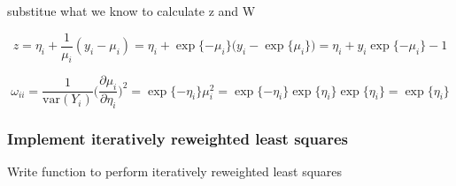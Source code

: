 \documentclass[]{article}
\begin{document}
substitue what we know to calculate z and W

\[z = \eta_i + \frac{1}{\mu_i} (y_i - \mu_i) = \eta_i + \exp{\{-\mu_i\}} \Big(y_i - \exp{\{\mu_i\}} \Big) = \eta_i + y_i \exp{\{-\mu_i\}} - 1\]

\[\omega_{ii} = \frac{1}{\text{var}(Y_i)} \Big( \frac{\partial \mu_i}{\partial \eta_i} \Big)^2 = \exp{\{-\eta_i\}} \mu_i^2 = \exp{\{-\eta_i\}} \exp{\{\eta_i\}} \exp{\{\eta_i\}} = \exp{\{\eta_i\}}\]

\subsubsection{Implement iteratively reweighted least
squares}\label{implement-iteratively-reweighted-least-squares}

Write function to perform iteratively reweighted least squares
\end{document}
